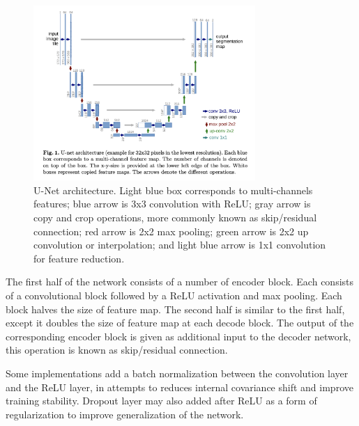 \begin{figure}
    \centering
    \includegraphics[width=0.75\textwidth]{images/preliminary/unet_arch.png}
    \caption{U-Net architecture. Light blue box corresponds to multi-channels features; blue arrow is 3x3 convolution with ReLU; gray arrow is copy and crop operations, more commonly known as skip/residual connection; red arrow is 2x2 max pooling; green arrow is 2x2 up convolution or interpolation; and light blue arrow is 1x1 convolution for feature reduction.\cite{ronnebergerUNetConvolutionalNetworks2015}} 
    \label{fig:unet_arch}
\end{figure}

The first half of the network consists of a number of encoder block. Each consists of a convolutional block followed by a ReLU activation and max pooling. Each block halves the size of feature map. The second half is similar to the first half, except it doubles the size of feature map at each decode block. The output of the corresponding encoder block is given as additional input to the decoder network, this operation is known as skip/residual connection.

Some implementations add a batch normalization between the convolution layer and the ReLU layer, in attempts to reduces internal covariance shift and improve training stability. Dropout layer may also added after ReLU as a form of regularization to improve generalization of the network.
